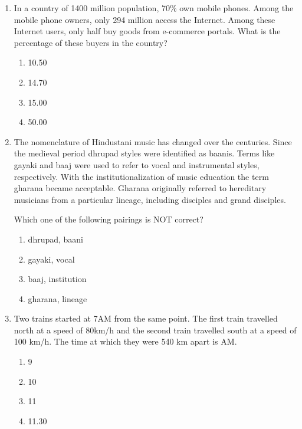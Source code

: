 \documentclass{article}
\begin{document}
\begin{enumerate}[leftmargin=*]
\item In a country of 1400 million population, 70\% own mobile phones. Among the mobile phone owners, only 294 million access the Internet. Among these Internet users, only half buy goods from e-commerce portals. What is the percentage of these buyers in the country?
\begin{multicols}{4}
\begin{enumerate}
\item 10.50
\item 14.70
\item 15.00
\item 50.00
\end{enumerate}
\end{multicols}

\item The nomenclature of Hindustani music has changed over the centuries. Since the medieval period dhrupad styles were identified as baanis. Terms like gayaki and baaj were used to refer to vocal and instrumental styles, respectively. With the institutionalization of music education the term gharana became acceptable. Gharana originally referred to hereditary musicians from a particular lineage, including disciples and grand disciples.

Which one of the following pairings is NOT correct?
\begin{multicols}{4}
\begin{enumerate}
\item dhrupad, baani
\item gayaki, vocal
\item baaj, institution
\item gharana, lineage
\end{enumerate}
\end{multicols}

\item Two trains started at 7AM from the same point. The first train travelled north at a speed of 80km/h and the second train travelled south at a speed of 100 km/h. The time at which they were 540 km apart is \underline{\hspace{1.5cm}} AM.
\begin{multicols}{4}
\begin{enumerate}
\item 9
\item 10
\item 11
\item 11.30
\end{enumerate}
\end{multicols}


\end{enumerate}
\end{document}
